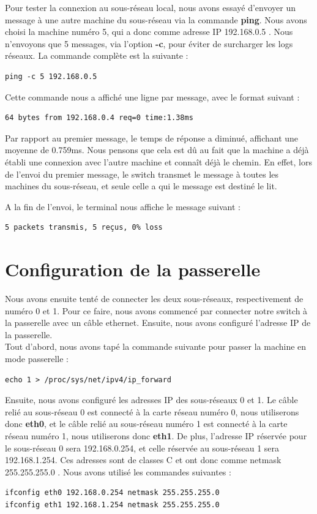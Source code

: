 \documentclass{article}
\begin{document}
Pour tester la connexion au sous-réseau local, nous avons essayé d'envoyer un message à une autre machine du sous-réseau via la commande \textbf{ping}. Nous avons choisi la machine numéro 5, qui a donc comme adresse IP 192.168.0.5 . Nous n'envoyons que 5 messages, via l'option \textbf{-c}, pour éviter de surcharger les logs réseaux. La commande complète est la suivante :
\begin{verbatim}
ping -c 5 192.168.0.5
\end{verbatim}
Cette commande nous a affiché une ligne par message, avec le format suivant :
\begin{verbatim}
64 bytes from 192.168.0.4 req=0 time:1.38ms
\end{verbatim}
Par rapport au premier message, le temps de réponse a diminué, affichant une moyenne de 0.759ms. Nous pensons que cela est dû au fait que la machine a déjà établi une connexion avec l'autre machine et connaît déjà le chemin. En effet, lors de l'envoi du premier message, le switch transmet le message à toutes les machines du sous-réseau, et seule celle a qui le message est destiné le lit.

A la fin de l'envoi, le terminal nous affiche le message suivant :
\begin{verbatim}
5 packets transmis, 5 reçus, 0% loss
\end{verbatim}

\section{Configuration de la passerelle}

Nous avons ensuite tenté de connecter les deux sous-réseaux, respectivement de numéro 0 et 1. Pour ce faire, nous avons commencé par connecter notre switch à la passerelle avec un câble ethernet. Ensuite, nous avons configuré l'adresse IP de la passerelle. \\

Tout d'abord, nous avons tapé la commande suivante pour passer la machine en mode passerelle :
\begin{verbatim}
echo 1 > /proc/sys/net/ipv4/ip_forward
\end{verbatim}
\newpage

Ensuite, nous avons configuré les adresses IP des sous-réseaux 0 et 1. Le câble relié au sous-réseau 0 est connecté à la carte réseau numéro 0, nous utiliserons donc \textbf{eth0}, et le câble relié au sous-réseau numéro 1 est connecté à la carte réseau numéro 1, nous utiliserons donc \textbf{eth1}.
De plus, l'adresse IP réservée pour le sous-réseau 0 sera 192.168.0.254, et celle réservée au sous-réseau 1 sera 192.168.1.254. Ces adresses sont de classes C et ont donc comme netmask 255.255.255.0 . Nous avons utilisé les commandes suivantes :
\begin{verbatim}
ifconfig eth0 192.168.0.254 netmask 255.255.255.0
ifconfig eth1 192.168.1.254 netmask 255.255.255.0
\end{verbatim}
\end{document}
